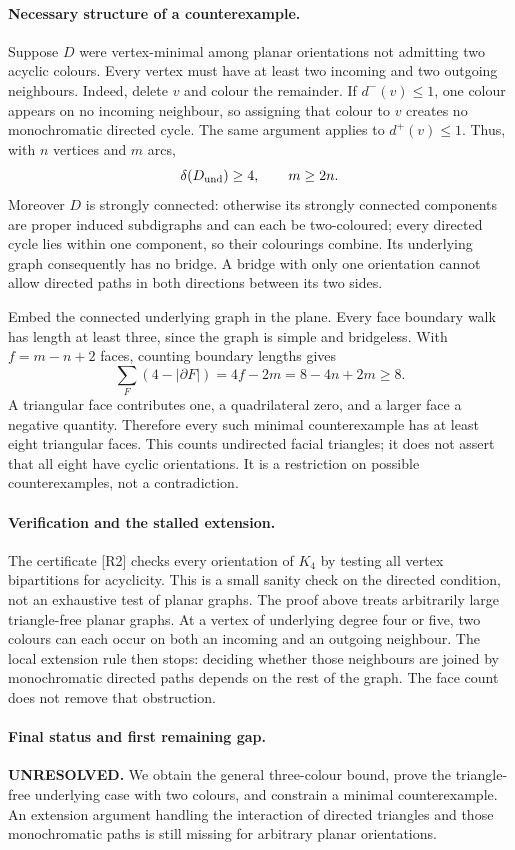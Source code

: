 \documentclass[11pt,a4paper]{article}
\begin{document}
\paragraph{Necessary structure of a counterexample.}
Suppose $D$ were vertex-minimal among planar orientations not admitting
two acyclic colours. Every vertex must have at least two incoming and
two outgoing neighbours. Indeed, delete $v$ and colour the remainder.
If $d^-(v)\le1$, one colour appears on no incoming neighbour, so assigning
that colour to $v$ creates no monochromatic directed cycle. The same
argument applies to $d^+(v)\le1$. Thus, with $n$ vertices and $m$ arcs,
\[
                  \delta(D_{\rm und})\ge4,\qquad m\ge2n.
\]
Moreover $D$ is strongly connected: otherwise its strongly connected
components are proper induced subdigraphs and can each be two-coloured;
every directed cycle lies within one component, so their colourings
combine. Its underlying graph consequently has no bridge. A bridge
with only one orientation cannot allow directed paths in both
directions between its two sides.

Embed the connected underlying graph in the plane. Every face boundary
walk has length at least three, since the graph is simple and
bridgeless. With $f=m-n+2$ faces, counting boundary lengths gives
\[
  \sum_F(4-|\partial F|)=4f-2m=8-4n+2m\ge8.
\]
A triangular face contributes one, a quadrilateral zero, and a larger
face a negative quantity. Therefore every such minimal counterexample
has at least eight triangular faces. This counts undirected facial
triangles; it does not assert that all eight have cyclic orientations.
It is a restriction on possible counterexamples, not a contradiction.

\paragraph{Verification and the stalled extension.}
The certificate [R2] checks every orientation of $K_4$ by testing all
vertex bipartitions for acyclicity. This is a small sanity check on the
directed condition, not an exhaustive test of planar graphs. The proof
above treats arbitrarily large triangle-free planar graphs.
At a vertex of underlying degree four or five, two colours can each
occur on both an incoming and an outgoing neighbour. The local
extension rule then stops: deciding whether those neighbours are joined
by monochromatic directed paths depends on the rest of the graph.
The face count does not remove that obstruction.

\paragraph{Final status and first remaining gap.}
\textbf{UNRESOLVED.} We obtain the general three-colour bound, prove
the triangle-free underlying case with two colours, and constrain a
minimal counterexample. An extension argument handling the interaction
of directed triangles and those monochromatic paths is still missing
for arbitrary planar orientations.
\end{document}
